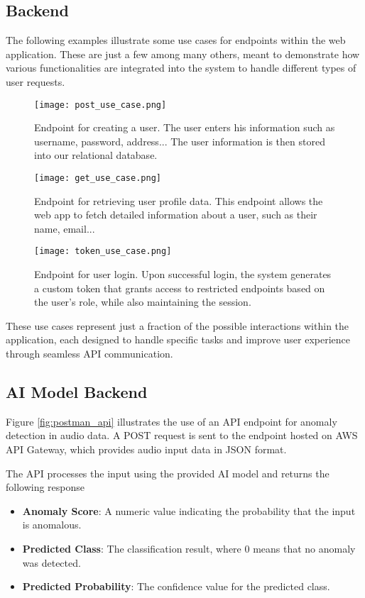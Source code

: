 \documentclass[conference]{IEEEtran}
\begin{document}
\subsection{Backend}

The following examples illustrate some use cases for endpoints within the web application. These are just a few among many others, meant to demonstrate how various functionalities are integrated into the system to handle different types of user requests.

\begin{figure}[H]
    \centering
    \texttt{[image: post\_use\_case.png]}
    \caption{Endpoint for creating a user. The user enters his information such as username, password, address... The user information is then stored into our relational database.}
\end{figure}


\begin{figure}[H]
    \centering
    \texttt{[image: get\_use\_case.png]}
    \caption{ Endpoint for retrieving user profile data. This endpoint allows the web app to fetch detailed information about a user, such as their name, email...}
\end{figure}

\begin{figure}[H]
    \centering
    \texttt{[image: token\_use\_case.png]}
    \caption{ Endpoint for user login. Upon successful login, the system generates a custom token that grants access to restricted endpoints based on the user's role, while also maintaining the session.}
\end{figure}


These use cases represent just a fraction of the possible interactions within the application, each designed to handle specific tasks and improve user experience through seamless API communication.

\subsection{AI Model Backend}

Figure \ref{fig:postman_api} illustrates the use of an API endpoint for anomaly detection in audio data. A POST request is sent to the endpoint hosted on AWS API Gateway, which provides audio input data in JSON format. 

The API processes the input using the provided AI model and returns the following response
\begin{itemize}
    \item \textbf{Anomaly Score}: A numeric value indicating the probability that the input is anomalous.
    \item \textbf{Predicted Class}: The classification result, where 0 means that no anomaly was detected.
    \item \textbf{Predicted Probability}: The confidence value for the predicted class.
\end{itemize}
\end{document}
